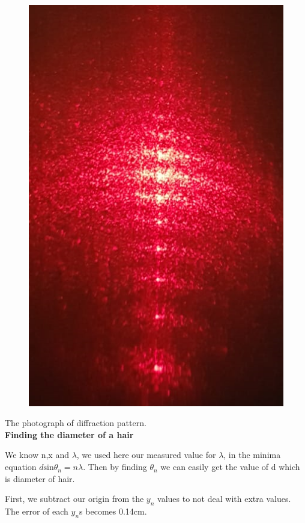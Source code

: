 \documentclass[11pt,a4paper]{article}
\begin{document}
{\begin{figure}[H]
\begin{center}
		\includegraphics[scale=0.7]{2.png}
	\end{center}
\end{figure}
The photograph of diffraction pattern.\\[\baselineskip]
\textbf{\small{Finding the diameter of a hair}}
\\[\baselineskip]
\par We know n,x and $\lambda$, we used here our measured value for $\lambda$, in the minima equation $d\mathrm{sin}{\theta }_{n}=n\lambda$. Then by finding $\theta_n$ we can easily get the value of d which is diameter of hair.
\par First, we subtract our origin from the $y_n$ values to not deal with extra values. The error of each $y_n$s becomes 0.14cm.
\begin{figure}[H]
	\begin{center}

\end{center}
\end{figure}}
\end{document}

